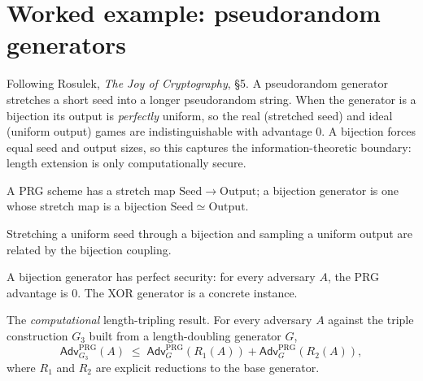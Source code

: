 \chapter{Worked example: pseudorandom generators}

Following Rosulek, \emph{The Joy of Cryptography}, §5. A pseudorandom generator
stretches a short seed into a longer pseudorandom string. When the generator is a
bijection its output is \emph{perfectly} uniform, so the real (stretched seed) and
ideal (uniform output) games are indistinguishable with advantage $0$. A bijection
forces equal seed and output sizes, so this captures the information-theoretic
boundary: length extension is only computationally secure.

\begin{definition}
  \label{def:bijprg}
  \leanok
  A PRG scheme has a stretch map $\mathrm{Seed} \to \mathrm{Output}$; a bijection
  generator is one whose stretch map is a bijection $\mathrm{Seed} \simeq
  \mathrm{Output}$.
\end{definition}

\begin{lemma}
  \label{lem:bijprg-coupling}
  \leanok
  Stretching a uniform seed through a bijection and sampling a uniform output are
  related by the bijection coupling.
\end{lemma}

\begin{theorem}
  \label{thm:bijprg-perfect}
  \leanok
  A bijection generator has perfect security: for every adversary $A$, the PRG
  advantage is $0$. The XOR generator is a concrete instance.
\end{theorem}

\begin{theorem}
  \label{thm:triple-prg}
  \leanok
  The \emph{computational} length-tripling result. For every adversary $A$ against
  the triple construction $G_3$ built from a length-doubling generator $G$,
  \[
    \mathsf{Adv}^{\mathrm{PRG}}_{G_3}(A) \;\le\;
      \mathsf{Adv}^{\mathrm{PRG}}_{G}(R_1(A)) + \mathsf{Adv}^{\mathrm{PRG}}_{G}(R_2(A)),
  \]
  where $R_1$ and $R_2$ are explicit reductions to the base generator.
\end{theorem}
